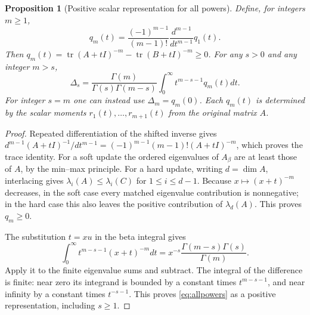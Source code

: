 \documentclass[11pt]{article}
\newtheorem{proposition}[theorem]{Proposition}
\DeclareMathOperator{\tr}{tr}
\begin{document}
\begin{proposition}[Positive scalar representation for all powers]\label{prop:allpowers}
Define, for integers $m\geq1$,
\[
 q_m(t)=\frac{(-1)^{m-1}}{(m-1)!}\frac{d^{m-1}}{dt^{m-1}}q_1(t).
\]
Then $q_m(t)=\tr(A+tI)^{-m}-\tr(B+tI)^{-m}\geq0$.
For any $s>0$ and any integer $m>s$,
\begin{equation}\label{eq:allpowers}
 \Delta_s=\frac{\Gamma(m)}{\Gamma(s)\Gamma(m-s)}
       \int_0^\infty t^{m-s-1}q_m(t)dt.
\end{equation}
For integer $s=m$ one can instead use $\Delta_m=q_m(0)$.
Each $q_m(t)$ is determined by the scalar moments
$r_1(t),\ldots,r_{m+1}(t)$ from the original matrix $A$.
\end{proposition}
\begin{proof}
Repeated differentiation of the shifted inverse gives
$d^{m-1}(A+tI)^{-1}/dt^{m-1}=(-1)^{m-1}(m-1)!(A+tI)^{-m}$,
which proves the trace identity. For a soft update the ordered
eigenvalues of $A_\beta$ are at least those of $A$, by the min--max
principle. For a hard update, writing $d=\dim A$, interlacing gives
$\lambda_i(A)\leq\lambda_i(C)$ for $1\leq i\leq d-1$.
Because $x\mapsto(x+t)^{-m}$ decreases, in the soft case every matched
eigenvalue contribution is nonnegative; in the hard case this also
leaves the positive contribution of $\lambda_d(A)$. This proves
$q_m\geq0$.

The substitution $t=xu$ in the beta integral gives
\[
 \int_0^\infty t^{m-s-1}(x+t)^{-m}dt
 =x^{-s}\frac{\Gamma(m-s)\Gamma(s)}{\Gamma(m)}.
\]
Apply it to the finite eigenvalue sums and subtract. The integral
of the difference is finite: near zero its integrand is bounded
by a constant times $t^{m-s-1}$, and near infinity by a constant
times $t^{-s-1}$. This proves \eqref{eq:allpowers} as a positive
representation, including $s\geq1$.


\end{proof}
\end{document}
